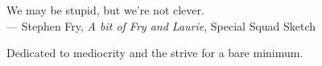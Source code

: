 \thispagestyle{empty}
{}

\vspace*{3cm}

\begin{center}
    We may be stupid, but we're not clever. \\ \medskip
    --- Stephen Fry, \emph{A bit of Fry and Laurie}, Special Squad Sketch
\end{center}

\medskip

\begin{center}
    Dedicated to mediocrity and the strive for a bare minimum. \\ \smallskip
\end{center}